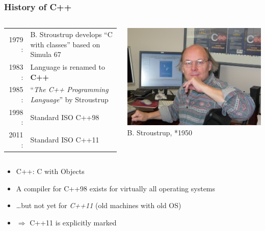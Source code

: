 \documentclass{slides}
\begin{document}
\begin{frame}
  \frametitle{History of C++}
  \begin{columns}[c,onlytextwidth]
    \begin{tabular}{r<{:}p{}}
      1979 & B. Stroustrup develops ``C with classes'' based on Simula 67\\
      1983 & Language is renamed to \textbf{C++}\\
      1985 & ``\emph{The C++ Programming Language}'' by Stroustrup\\
      1998 & Standard ISO C++98\\
      2011 & Standard ISO C++11
    \end{tabular}
    
    \centering
    \includegraphics[height=0.25\textheight]{stroustrup}\\
    {\tiny B. Stroustrup, *1950}
  \end{columns}

  \vspace{0.5em}
  \begin{itemize}
  \item C++: C with Objects
  \item A compiler for C++98 exists for virtually all operating
    systems
  \item \dots but not yet for \emph{C++11} (old machines with old OS)
  \item $\Rightarrow$ C++11 is explicitly marked
  \end{itemize}
\end{frame}
\end{document}
